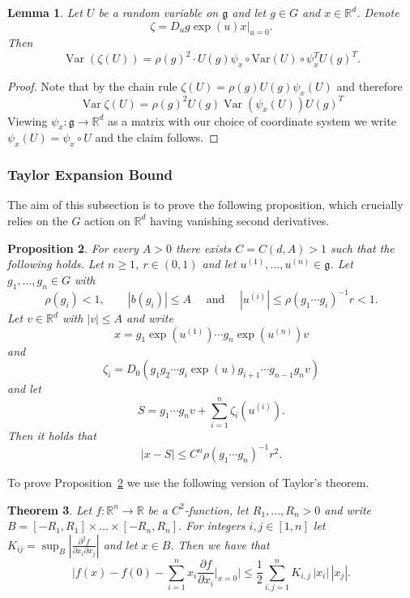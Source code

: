 \documentclass[10pt, english,oneside,reqno]{amsart}
\theoremstyle{plain}
\newtheorem{theorem}{Theorem}[section]
\newtheorem{proposition}[theorem]{Proposition}
\newtheorem{lemma}[theorem]{Lemma}
\theoremstyle{remark}
\numberwithin{equation}{section}
\numberwithin{figure}{section}
\DeclareMathOperator{\var}{Var}
\newcommand{\R}{\mathbb{R}}
\begin{document}
\begin{lemma}\label{ZetaVariance}
    Let $U$ be a random variable on $\mathfrak{g}$ and let $g\in G$ and $x \in \R^d$. Denote $$\zeta = D_u g\exp(u)x|_{u = 0}.$$ Then $$\var(\zeta(U)) = \rho(g)^2 \cdot U(g) \psi_x \circ \mathrm{Var}(U) \circ \psi_x^T U(g)^T.$$
\end{lemma}

\begin{proof}
    Note that by the chain rule $\zeta(U) = \rho(g)U(g)\psi_x(U)$ and therefore $$\var \zeta(U) = \rho(g)^2 U(g)\var(\psi_x(U))U(g)^T$$ Viewing $\psi_x: \mathfrak{g} \to \R^d$ as a matrix with our choice of coordinate system we write $\psi_x(U) = \psi_x \circ U$ and the claim follows.
\end{proof}


\subsubsection{Taylor Expansion Bound} The aim of this subsection is to prove the following proposition, which crucially relies on the $G$ action on $\R^d$ having vanishing second derivatives. 

\begin{proposition}\label{MainTaylorBound}
    For every $A > 0$ there exists $C = C(d,A) > 1$ such that the following holds. Let $n \geq 1$, $r \in (0,1)$ and let $u^{(1)}, \ldots , u^{(n)} \in \mathfrak{g}$. Let $g_1, \ldots , g_n \in G$ with $$\rho(g_i) < 1, \quad \quad |b(g_i)| \leq A \quad \text{ and } \quad |u^{(i)}| \leq \rho(g_1 \cdots g_i)^{-1}r < 1.$$ Let $v \in \R^d$ with $|v| \leq A$ and write $$x = g_1 \exp(u^{(1)})\cdots g_n\exp(u^{(n)})v$$ and $$\zeta_i = D_0(g_1g_2 \cdots g_{i}\exp(u)g_{i + 1} \cdots g_{n-1}g_n v)$$ and let $$S = g_1\cdots g_n v + \sum_{i = 1}^n \zeta_i(u^{(i)}).$$ Then it holds that $$|x-S| \leq C^n\rho(g_1 \cdots g_n)^{-1}r^2.$$
\end{proposition}



To prove Proposition~\ref{MainTaylorBound} we use the following version of Taylor's theorem.

\begin{theorem}\label{Taylor}
    Let $f: \R^n \to \R$ be a $C^2$-function, let $R_1, \ldots , R_n > 0$ and write $B = [-R_1, R_1] \times \ldots \times [-R_n, R_n]$. For integers $i,j \in [1,n]$ let $K_{ij} = \sup_B |\frac{\partial^2 f}{\partial x_i \partial x_j}|$ and let $x\in B$. Then we have that $$\bigg| f(x) - f(0) - \sum_{i = 1}^n x_i \frac{\partial f}{\partial x_i}\bigg|_{x = 0}  \bigg| \leq \frac{1}{2}\sum_{i,j = 1}^n  K_{i,j}\, |x_i|\,|x_j|.$$
\end{theorem}
\end{document}
